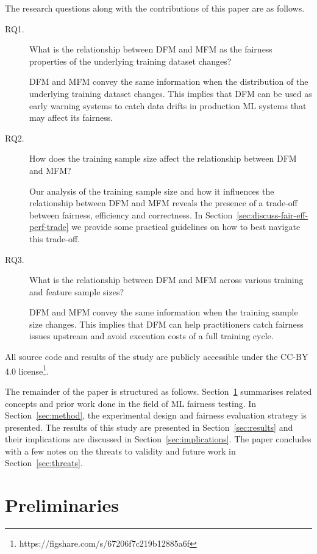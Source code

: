 \documentclass[sigconf,review,anonymous]{acmart}
\begin{document}
The research questions along with the contributions of this paper are
as follows.
\begin{description}
  \item[RQ1.] What is the relationship between DFM and MFM as the
    fairness properties of the underlying training dataset changes?

    DFM and MFM convey the same information when the distribution of
    the underlying training dataset changes. This implies that DFM can
    be used as early warning systems to catch data drifts in
    production ML systems that may affect its fairness.

  \item[RQ2.] How does the training sample size affect the
    relationship between DFM and MFM?

    Our analysis of the training sample size and how it influences the
    relationship between DFM and MFM reveals the presence of a
    trade-off between fairness, efficiency and correctness. In
    Section \ref{sec:discuss-fair-eff-perf-trade} we provide some
    practical guidelines on how to best navigate this trade-off.

  \item[RQ3.] What is the relationship between DFM and MFM across
    various training and feature sample sizes?

    DFM and MFM convey the same information when the training sample
    size changes. This implies that DFM can help practitioners catch
    fairness issues upstream and avoid execution costs of a full
    training cycle.
\end{description}

All source code and results of the study are publicly accessible under
the CC-BY 4.0
license\footnote{https://figshare.com/s/67206f7c219b12885a6f}.

The remainder of the paper is structured as follows.
Section \ref{sec:related} summarises related concepts and prior work
done in the field of ML fairness testing. In Section \ref{sec:method},
the experimental design and fairness evaluation strategy is presented.
The results of this study are presented in Section \ref{sec:results}
and their implications are discussed in
Section \ref{sec:implications}. The paper concludes with a few notes
on the threats to validity and future work in
Section \ref{sec:threats}.

\section{Preliminaries}\label{sec:related}
\end{document}
